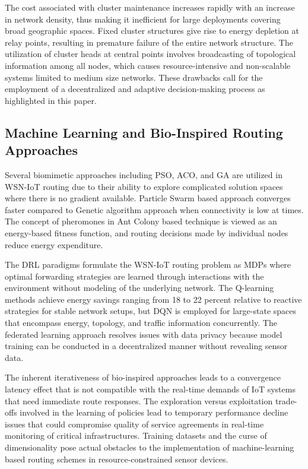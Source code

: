 \documentclass[a4paper,fleqn]{cas-dc}
\numberwithin{equation}{section}
\begin{document}
The cost associated with cluster maintenance increases rapidly with an increase in network density,
thus making it inefficient for large deployments covering broad geographic spaces.\cite{Harbi2023BlockchainIoDSecurity}
Fixed cluster structures give rise to energy depletion at relay points, resulting in premature failure of the entire network structure.
The utilization of cluster heads at central points involves broadcasting of topological information among all nodes, which causes resource-intensive and non-scalable systems limited to medium size networks.
These drawbacks call for the employment of a decentralized and adaptive decision-making process as highlighted in this paper.
\subsection{Machine Learning and Bio-Inspired Routing Approaches}
\label{subsec:lit_ml}

Several biomimetic approaches including PSO, ACO, and GA are utilized in WSN-IoT routing due to their ability to explore complicated solution spaces where there is no gradient available. Particle Swarm based approach converges faster compared to Genetic algorithm approach when connectivity is low at times. The concept of pheromones in Ant Colony based technique is viewed as an energy-based fitness function, and routing decisions made by individual nodes reduce energy expenditure.

The DRL paradigms formulate the WSN-IoT routing problem as
MDPs where optimal forwarding strategies are learned through interactions
with the environment without modeling of the underlying network.\cite{R3_Narkedimilli2025AdaptiveCurriculumIoT,R7_Baral2024AdaptiveEndToEndIoT}
The Q-learning methods achieve energy savings ranging from 18 to
22 percent relative to reactive strategies for stable network setups, but DQN is employed for large-state spaces that encompass energy, topology,
and traffic information concurrently. The federated learning approach resolves
issues with data privacy because model training can be conducted in a decentralized manner without revealing sensor data.

The inherent iterativeness of bio-inspired approaches leads to a
convergence latency effect that is not compatible with the real-time
demands of IoT systems that need immediate route responses.
\cite{R2_Alzaylaee2025SmartHomeVulnerabilities} The exploration versus
exploitation trade-offs involved in the learning of policies lead to
temporary performance decline issues that could compromise quality of
service agreements in real-time monitoring of critical infrastructures.
Training datasets and the curse of dimensionality pose actual
obstacles to the implementation of machine-learning based routing
schemes in resource-constrained sensor devices.
\end{document}
